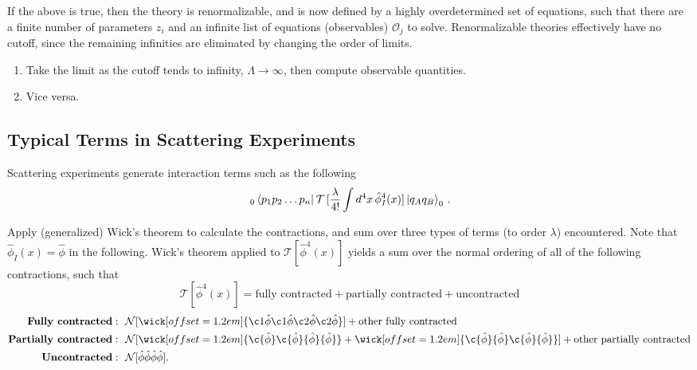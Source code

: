 \noindent If the above is true, then the theory is renormalizable, and is now defined by a highly overdetermined set of equations, such that there are a finite number of parameters $z_i$ and an infinite list of equations (observables) $\mathcal{O}_j$ to solve. Renormalizable theories effectively have no cutoff, since the remaining infinities are eliminated by changing the order of limits.
\begin{enumerate}
\item Take the limit as the cutoff tends to infinity, $\Lambda \to \infty$, then compute observable quantities.
\item Vice versa.
\end{enumerate}

\subsection*{Typical Terms in Scattering Experiments}

\noindent Scattering experiments generate interaction terms such as the following
\begin{equation}
\,_0 \bra{p_1 p_2 \dots p_n} \mathcal{T} \, [\frac{\lambda}{4!} \int d^4 x \, \hat{\phi}_I^4(x)]\ket{q_A q_B}_0 \,.
\end{equation}

\noindent Apply (generalized) Wick's theorem to calculate the contractions, and sum over three types of terms (to order $\lambda$) encountered. Note that $\hat{\phi}_I (x) = \hat{\phi}$ in the following. Wick's theorem applied to $\mathcal{T}[\hat{\phi}^4 (x)]$ yields a sum over the normal ordering of all of the following contractions, such that 
\begin{equation}
\mathcal{T}[\hat{\phi}^4 (x)] = \text{fully contracted} + \text{partially contracted} + \text{uncontracted}
\end{equation}
\begin{align*}
\textbf{Fully contracted}: &\,\,\,\, \mathcal{N}[ \wick[offset=1.2em]{\c1 {\hat{\phi}} \c1 {\hat{\phi}} \c2 {\hat{\phi}} \c2 {\hat{\phi}} }] + \text{other fully contracted} \\
\textbf{Partially contracted}: &\,\,\,\, \mathcal{N}[ \wick[offset=1.2em]{\c {\hat{\phi}} \c {\hat{\phi}} {\hat{\phi}} {\hat{\phi}}} + \wick[offset=1.2em]{\c {\hat{\phi}} {\hat{\phi}} \c {\hat{\phi}} {\hat{\phi}}}] + \text{other partially contracted} \\
\textbf{Uncontracted}: &\,\,\,\, \mathcal{N} [ \hat{\phi} \hat{\phi} \hat{\phi} \hat{\phi}].
\end{align*}


